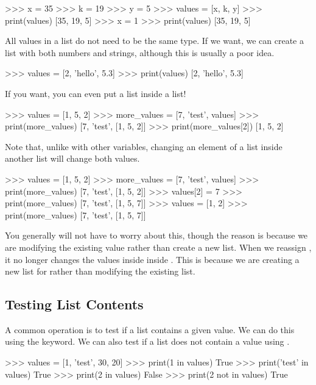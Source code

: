 \documentclass[11pt]{cselabheader}
\begin{document}
\begin{pyconcode}
>>> x = 35
>>> k = 19
>>> y = 5
>>> values = [x, k, y]
>>> print(values)
[35, 19, 5]
>>> x = 1
>>> print(values)
[35, 19, 5]
\end{pyconcode}

All values in a list do not need to be the same type. If we want, we can create
a list with both numbers and strings, although this is usually a poor idea.

\begin{pyconcode}
>>> values = [2, 'hello', 5.3]
>>> print(values)
[2, 'hello', 5.3]
\end{pyconcode}

If you want, you can even put a list inside a list!

\begin{pyconcode}
>>> values = [1, 5, 2]
>>> more_values = [7, 'test', values]
>>> print(more_values)
[7, 'test', [1, 5, 2]]
>>> print(more_values[2])
[1, 5, 2]
\end{pyconcode}

Note that, unlike with other variables, changing an element of a list inside
another list will change both values.

\begin{pyconcode}
>>> values = [1, 5, 2]
>>> more_values = [7, 'test', values]
>>> print(more_values)
[7, 'test', [1, 5, 2]]
>>> values[2] = 7
>>> print(more_values)
[7, 'test', [1, 5, 7]]
>>> values = [1, 2]
>>> print(more_values)
[7, 'test', [1, 5, 7]]
\end{pyconcode}

You generally will not have to worry about this, though the reason is because we
are modifying the existing value rather than create a new list. When we reassign
, it no longer changes the values inside inside
. This is because we are creating a new list for
 rather than modifying the existing list.

\subsection{Testing List Contents}
A common operation is to test if a list contains a given value. We can do this
using the  keyword. We can also test if a list does not contain a
value using .

\begin{pyconcode}
>>> values = [1, 'test', 30, 20]
>>> print(1 in values)
True
>>> print('test' in values)
True
>>> print(2 in values)
False
>>> print(2 not in values)
True
\end{pyconcode}
\end{document}

